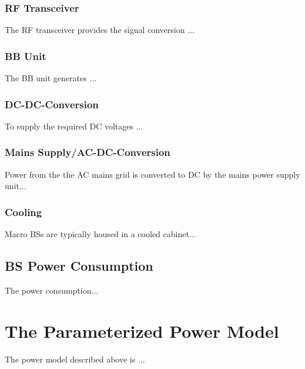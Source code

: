 \subsubsection{\ac{RF} Transceiver}
The \ac{RF} transceiver provides the signal conversion ...

\subsubsection{\ac{BB} Unit}
The \ac{BB} unit generates ...


\subsubsection{\ac{DC}-\ac{DC}-Conversion}
To supply the required \ac{DC} voltages ...

\subsubsection{Mains Supply/\ac{AC}-\ac{DC}-Conversion}
Power from the the \ac{AC} mains grid is converted to \ac{DC} by the mains power supply unit...

\subsubsection{Cooling}
Macro \acp{BS} are typically housed in a cooled cabinet...

\subsection{\ac{BS} Power Consumption}
The power consumption...

\section{The Parameterized Power Model}
\label{parameterizedmodel}
The power model described above is ...

